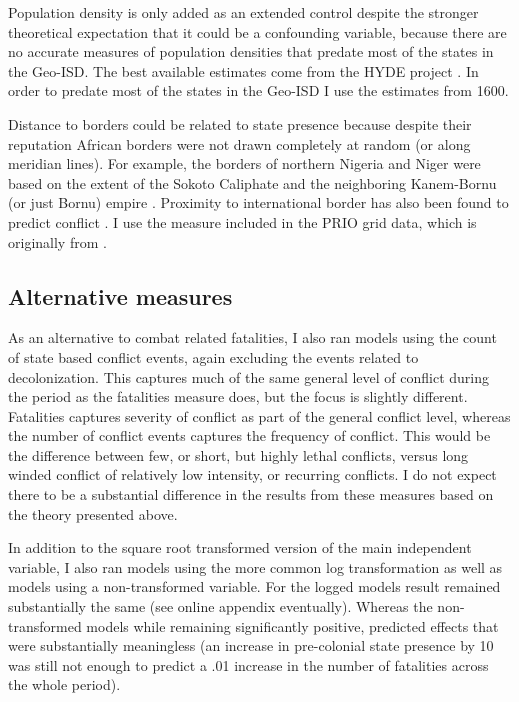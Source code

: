 \documentclass[12pt]{article}
\begin{document}
Population density is only added as an extended control despite the stronger
theoretical expectation that it could be a confounding variable, because there
are no accurate measures of population densities that predate most of the
states in the Geo-ISD. The best available estimates come from the HYDE project
\citep{Goldewijk2016}. In order to predate most of the states in the Geo-ISD I
use the estimates from 1600.


Distance to borders could be related to state presence because despite their
reputation African borders were not drawn completely at random (or along
meridian lines). For example, the borders of northern Nigeria and Niger were
based on the extent of the Sokoto Caliphate and the neighboring Kanem-Bornu (or
just Bornu) empire \citep{HiribarrenVincent2017AHoB}. Proximity to international
border has also been found to predict conflict \citep{Buhaug2002}. I use the
measure included in the PRIO grid data, which is originally from
\citet{Weidmann2010a}.

\subsection{Alternative measures}

As an alternative to combat related fatalities, I also ran models using the
count of state based conflict events, again excluding the events related to
decolonization. This captures much of the same general level of conflict during
the period as the fatalities measure does, but the focus is slightly different.
Fatalities captures severity of conflict as part of the general conflict level,
whereas the number of conflict events captures the frequency of conflict. This
would be the difference between few, or short, but highly lethal conflicts,
versus long winded conflict of relatively low intensity, or recurring conflicts.
I do not expect there to be a substantial difference in the results from these
measures based on the theory presented above.

In addition to the square root transformed version of the main independent
variable, I also ran models using the more common log transformation as well as
models using a non-transformed variable. For the logged models result remained
substantially the same (see online appendix eventually). Whereas the
non-transformed models while remaining significantly positive, predicted effects
that were substantially meaningless (an increase in pre-colonial state presence
by 10 was still not enough to predict a .01 increase in the number of fatalities
across the whole period).
\end{document}
